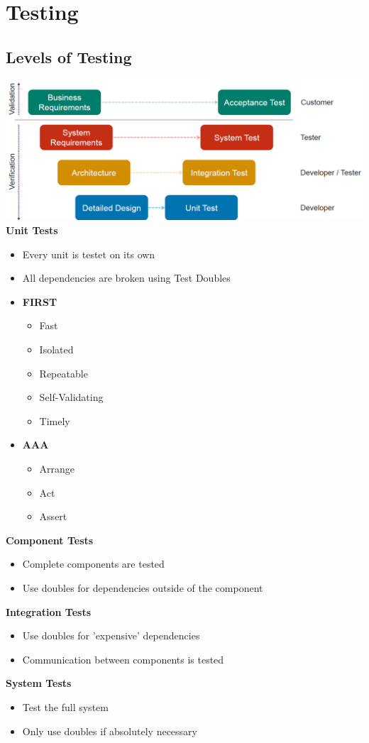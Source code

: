 
\section{Testing}
\subsection{Levels of Testing}
\includegraphics[width=\linewidth]{../img/levels_of_testing.png}
\textbf{Unit Tests}
\begin{itemize}
    \item Every unit is testet on its own
    \item All dependencies are broken using Test Doubles
    \item \textbf{FIRST}
    \begin{itemize}
        \item Fast
        \item Isolated
        \item Repeatable
        \item Self-Validating
        \item Timely
    \end{itemize}
    \item \textbf{AAA}
    \begin{itemize}
        \item Arrange
        \item Act
        \item Assert
    \end{itemize}
\end{itemize}
\textbf{Component Tests}
\begin{itemize}
    \item Complete components are tested
    \item Use doubles for dependencies outside of the component
\end{itemize}
\textbf{Integration Tests}
\begin{itemize}
    \item Use doubles for 'expensive' dependencies
    \item Communication between components is tested
\end{itemize}
\textbf{System Tests}
\begin{itemize}
    \item Test the full system
    \item Only use doubles if absolutely necessary
\end{itemize}

